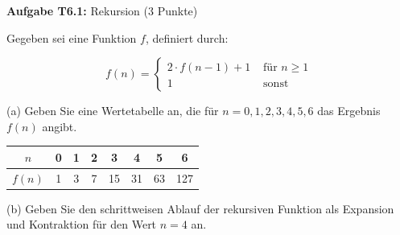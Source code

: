 \RequirePackage{fix-cm}


\newcommand{\obenlinks}{Übungen zur Vorlesung Informatik I}   %




\graphicspath{ {./images/} }

\textbf{Aufgabe T6.1:} Rekursion (3 Punkte)

Gegeben sei eine Funktion $f$, definiert durch:

$$
f(n)= \begin{cases}2 \cdot f(n-1)+1 & \text { für } n \geq 1 \\ 1 & \text { sonst }\end{cases}
$$

(a) Geben Sie eine Wertetabelle an, die für $n=0,1,2,3,4,5,6$ das Ergebnis $f(n)$ angibt.
\begin{center}
  \begin{tabular}{c|c|c|c|c|c|c|c}
    $n$ & 0 & 1 & 2 & 3 & 4 & 5 & 6 \\
    \hline$f(n)$ & 1 & 3 & 7 & 15 & 31 & 63 & 127
    \end{tabular}
\end{center}


(b) Geben Sie den schrittweisen Ablauf der rekursiven Funktion als Expansion und Kontraktion für den Wert $n=4$ an.


